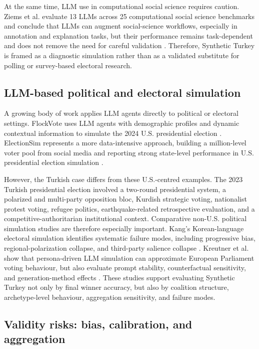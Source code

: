\documentclass[pdflatex,sn-mathphys-num,iicol]{sn-jnl}
\begin{document}
At the same time, LLM use in computational social science requires caution. Ziems et al. evaluate 13 LLMs across 25 computational social science benchmarks and conclude that LLMs can augment social-science workflows, especially in annotation and explanation tasks, but their performance remains task-dependent and does not remove the need for careful validation \cite{ziems2024css}. Therefore, Synthetic Turkey is framed as a diagnostic simulation rather than as a validated substitute for polling or survey-based electoral research.

\subsection{LLM-based political and electoral simulation}

A growing body of work applies LLM agents directly to political or electoral settings. FlockVote uses LLM agents with demographic profiles and dynamic contextual information to simulate the 2024 U.S. presidential election \cite{zhou2025flockvote}. ElectionSim represents a more data-intensive approach, building a million-level voter pool from social media and reporting strong state-level performance in U.S. presidential election simulation \cite{zhang2024electionsim}.

However, the Turkish case differs from these U.S.-centred examples. The 2023 Turkish presidential election involved a two-round presidential system, a polarized and multi-party opposition bloc, Kurdish strategic voting, nationalist protest voting, refugee politics, earthquake-related retrospective evaluation, and a competitive-authoritarian institutional context. Comparative non-U.S. political simulation studies are therefore especially important. Kang's Korean-language electoral simulation identifies systematic failure modes, including progressive bias, regional-polarization collapse, and third-party salience collapse \cite{kang2026dynamok}. Kreutner et al. show that persona-driven LLM simulation can approximate European Parliament voting behaviour, but also evaluate prompt stability, counterfactual sensitivity, and generation-method effects \cite{kreutner2026ep}. These studies support evaluating Synthetic Turkey not only by final winner accuracy, but also by coalition structure, archetype-level behaviour, aggregation sensitivity, and failure modes.

\subsection{Validity risks: bias, calibration, and aggregation}
\end{document}
